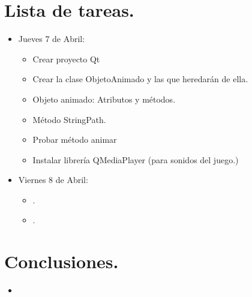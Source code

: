 \documentclass{article}
\begin{document}
\section{Lista de tareas.}
\begin{itemize}
    \item Jueves 7 de Abril:
    \begin{itemize}
        \item Crear proyecto Qt
        \item Crear la clase ObjetoAnimado y las que heredarán de ella.
        \item Objeto animado: Atributos y métodos.
        \item Método StringPath.
        \item Probar método animar
        \item Instalar librería QMediaPlayer (para sonidos del juego.)
        
    \end{itemize}
    \item Viernes 8 de Abril:
    \begin{itemize}
        \item .
        \item .
    \end{itemize}

\end{itemize}


    




\section{Conclusiones.}
    \begin{itemize}
        \item
    \end{itemize}
\end{document}

